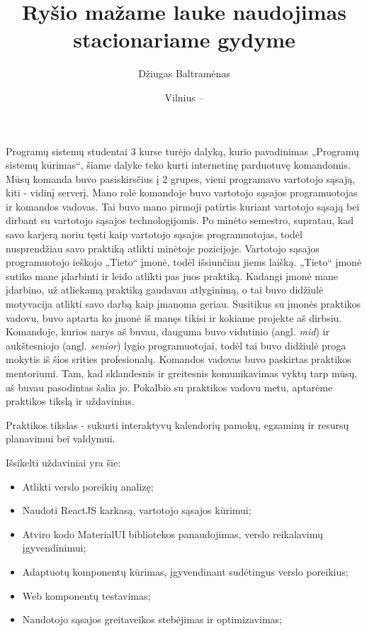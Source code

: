 \documentclass{VUMIFPSbakalaurinis}
\title{Ryšio mažame lauke naudojimas stacionariame gydyme}
\author{Džiugas Baltramėnas}
\date{Vilnius – \the\year}
\begin{document}
\maketitle

\tableofcontents

Programų sistemų studentai 3 kurse turėjo dalyką, kurio pavadinimas „Programų sistemų kūrimas“, šiame dalyke teko kurti internetinę parduotuvę komandomis. Mūsų komanda buvo pasiskirsčius į 2 grupes, vieni programavo vartotojo sąsają, kiti - vidinį serverį. Mano rolė komandoje buvo vartotojo sąsajos programuotojas ir komandos vadovas. Tai buvo mano pirmoji patirtis kuriant vartotojo sąsają bei dirbant su vartotojo sąsajos technologijomis. Po minėto semestro, supratau, kad savo karjerą noriu tęsti kaip vartotojo sąsajos programuotojas, todėl nusprendžiau savo praktiką atlikti minėtoje pozicijoje. Vartotojo sąsajos programuotojo ieškojo „Tieto“ įmonė, todėl išsiunčiau jiems laišką. „Tieto“ įmonė sutiko mane įdarbinti ir leido atlikti pas juos praktiką. Kadangi įmonė mane įdarbino, už atliekamą praktiką gaudavau atlyginimą, o tai buvo didžiulė motyvacija atlikti savo darbą kaip įmanoma geriau. Susitikus su įmonės praktikos vadovu, buvo aptarta ko įmonė iš manęs tikisi ir kokiame projekte aš dirbsiu. Komandoje, kurios narys aš buvau, dauguma buvo vidutinio (angl. \textit{mid}) ir aukštesniojo (angl. \textit{senior}) lygio programuotojai, todėl tai buvo didžiulė proga mokytis iš šios srities profesionalų. Komandos vadovas buvo paskirtas praktikos mentoriumi. Tam, kad sklandesnis ir greitesnis komunikavimas vyktų tarp mūsų, aš buvau pasodintas šalia jo. Pokalbio su praktikos vadovu metu, aptarėme praktikos tikslą ir uždavinius.

Praktikos tikslas - sukurti interaktyvų kalendorių pamokų, egzaminų ir resursų planavimui bei valdymui.

Išsikelti uždaviniai yra šie:
\begin{itemize}
    \item Atlikti verslo poreikių analizę;
    \item Naudoti ReactJS karkasą, vartotojo sąsajos kūrimui;
    \item Atviro kodo MaterialUI bibliotekos panaudojimas, verslo reikalavimų įgyvendinimui;
    \item Adaptuotų komponentų kūrimas, įgyvendinant sudėtingus verslo poreikius;
    \item Web komponentų testavimas;
    \item Naudotojo sąsajos greitaveikos stebėjimas ir optimizavimas;
\end{itemize}
\end{document}
